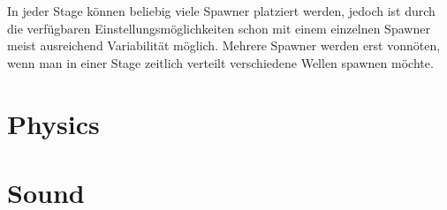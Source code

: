 In jeder Stage können beliebig viele Spawner platziert werden, jedoch ist durch die verfügbaren Einstellungsmöglichkeiten schon mit einem einzelnen Spawner meist ausreichend Variabilität möglich. Mehrere Spawner werden erst vonnöten, wenn man in einer Stage zeitlich verteilt verschiedene Wellen spawnen möchte.




\section{Physics}

\lipsum[3]



\section{Sound}

\lipsum[3]
